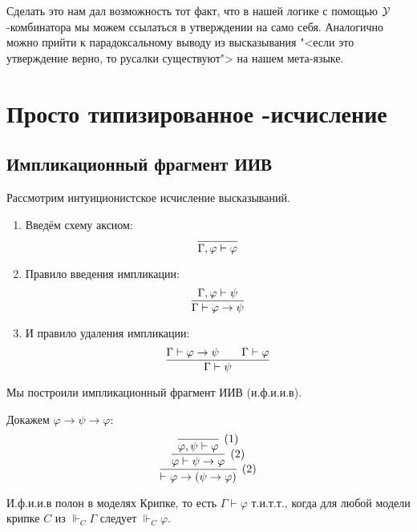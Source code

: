 Сделать это нам дал возможность тот факт,
что в нашей логике с помощью $\operatorname{\mathcal{Y}}$-комбинатора мы можем ссылаться в утверждении на само себя.
Аналогично можно прийти к парадоксальному выводу из высказывания "<если это утверждение верно, то русалки существуют"> на нашем мета-языке.

\section{\texorpdfstring{Просто типизированное \textlambda-исчисление}{Simply typed lambda calculus}}

\subsection{\texorpdfstring{Импликационный фрагмент ИИВ}{Implication fragment of intuitionistic logic}}

\begin{definition}
    Рассмотрим интуиционистское исчисление высказываний.
    \begin{enumerate}
        \item Введём схему аксиом:
        \[
            \infer{\Gamma, \varphi \vdash \varphi}{}
        \]
        \item Правило введения импликации:
        \[
            \infer{\Gamma \vdash \varphi \to \psi}{\Gamma, \varphi \vdash \psi}
        \]
        \item И правило удаления импликации:
        \[
            \infer{\Gamma \vdash \psi}{\Gamma \vdash \varphi \to \psi && \Gamma \vdash \varphi}
        \]
    \end{enumerate}

    Мы построили импликационный фрагмент ИИВ (и.ф.и.и.в).
\end{definition}

\begin{example} Докажем $\varphi \to \psi \to \varphi$:
\[
    \infer[(2)]
        { \vdash \varphi \to (\psi \to \varphi) }
        { \infer[(2)]
            { \varphi \vdash \psi \to \varphi }
            { \infer[(1)]
                { \varphi, \psi \vdash \varphi}
                {}
            }
        }
\]
\end{example}

\begin{theorem}
    И.ф.и.и.в полон в моделях Крипке, то есть $\Gamma \vdash \varphi$ т.и.т.т.,
    когда для любой модели крипке $C$ из $\Vdash_C \Gamma$ следует $\Vdash_C \varphi$.
\end{theorem}

